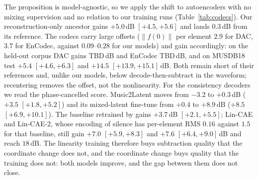 \documentclass[conference]{IEEEtran}
\newcommand{\tabref}[1]{Table~\ref{#1}}
\begin{document}
The proposition is model-agnostic, so we apply the shift to autoencoders with
no mixing supervision and no relation to our training runs
(\tabref{tab:codecs}). Our reconstruction-only ancestor gains $+5.0$\,dB
$[+4.5,+5.6]$ and lands $0.3$\,dB from its reference. The codecs carry large
offsets ($\lVert f(0)\rVert$ per element $2.9$ for DAC, $3.7$ for EnCodec,
against $0.09$--$0.28$ for our models) and gain accordingly: on the held-out
corpus DAC gains TBD\,dB and EnCodec TBD\,dB, and on MUSDB18 test $+5.4$
$[+4.6,+6.3]$ and $+14.5$ $[+13.9,+15.1]$\,dB. Both remain short of their
references and, unlike our models, below decode-then-subtract in the
waveform; recentering removes the offset, not the nonlinearity. For the
consistency decoders we read the phase-cancelled score. Music2Latent moves
from $-3.2$ to $+0.3$\,dB ($+3.5$ $[+1.8,+5.2]$) and its mixed-latent
fine-tune from $+0.4$ to $+8.9$\,dB ($+8.5$ $[+6.9,+10.1]$). The baseline
retrained by \cite{torres2026linearity} gains $+3.7$\,dB $[+2.1,+5.5]$;
Lin-CAE and Lin-CAE-2, whose encoding of silence has per-element RMS $0.16$
against $1.5$ for that baseline, still gain $+7.0$ $[+5.9,+8.3]$ and $+7.6$
$[+6.4,+9.0]$\,dB and reach $18$\,dB. The linearity training therefore buys
subtraction quality that the coordinate change does not, and the coordinate
change buys quality that the training does not: both models improve, and the
gap between them does not close.
\end{document}
